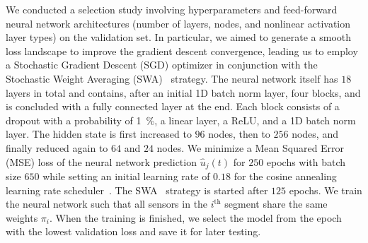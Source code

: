 We conducted a selection study involving hyperparameters and feed-forward neural network architectures (number of layers, nodes, and nonlinear activation layer types) on the validation set. %
In particular, we aimed to generate a smooth loss landscape to improve the gradient descent convergence, leading us to employ a Stochastic Gradient Descent (SGD) %
optimizer in conjunction with the Stochastic Weight Averaging (SWA)~\citep{izmailov2018averaging} strategy.
The neural network itself %
has $18$ layers in total and contains, after an initial 1D batch norm layer, four blocks, and is concluded with a fully connected layer at the end. Each block consists of a dropout with a probability of \SI{1}{\percent}, a linear layer, a ReLU, and a 1D batch norm layer. The hidden state is first increased to $96$ nodes, then to $256$ nodes, and finally reduced again to $64$ and $24$ nodes.
We minimize a Mean Squared Error (MSE) loss of the neural network prediction $\hat{u}_j(t)$ for $250$ epochs with batch size $650$ while setting an initial learning rate of $0.18$ for the cosine annealing learning rate scheduler~\citep{loshchilov2016sgdr}. The SWA~\citep{izmailov2018averaging} strategy is started after $125$ epochs.
We train the neural network such that all sensors in the $i^\mathrm{th}$ segment share the same weights $\pi_i$.
When the training is finished, we select the model from the epoch with the lowest validation loss and save it for later testing.

